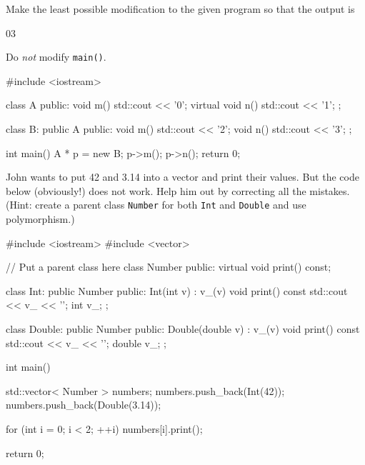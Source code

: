 

\nextq
Make the least possible modification to the given program so that the output is
\begin{console}[fontsize=\footnotesize]
03
\end{console}
Do \textit{not} modify \verb!main()!.
\\
\ANSWER
\begin{answercode}
#include <iostream>

class A
{
public:
    void m()
    {
        std::cout << '0';
    }
    virtual void n()
    {
        std::cout << '1';
    }
};

class B: public A
{
public:
    void m()
    {
        std::cout << '2';
    }
    void n()
    {
        std::cout << '3';
    }
};

int main()
{
    A * p = new B;
    p->m();
    p->n();
    return 0;
}
\end{answercode}

\nextq
John wants to put 42 and 3.14 into a vector and print their values.
But the code below (obviously!) does not work.
Help him out by correcting all the mistakes.
(Hint: create a parent class \verb!Number! for both \verb!Int!
and \verb!Double! and use polymorphism.)
\\
\ANSWER
\begin{answercode}
#include <iostream>
#include <vector>

// Put a parent class here
class Number
{
  public:
  virtual void print() const;
}

class Int: public Number
{
public:
    Int(int v)
        : v_(v)
    {}
    void print() const
    {
        std::cout << v_ << '\n';
    }
    int v_;
};

class Double: public Number
{
public:
    Double(double v)
        : v_(v)
    {}
    void print() const
    {
        std::cout << v_ << '\n';
    }
    double v_;
};

int main()
{
    std::vector< Number > numbers;
    numbers.push_back(Int(42));
    numbers.push_back(Double(3.14));

    for (int i = 0; i < 2; ++i)
    {
        numbers[i].print();
    }

    return 0;
}
\end{answercode}



